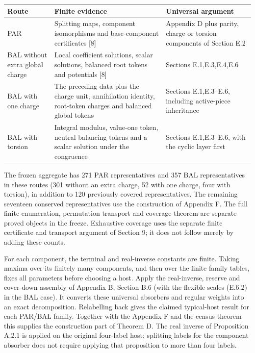 \documentclass[english,11pt,a4paper]{article}
\begin{document}
{\begin{longtable}[]{@{}
  >{\raggedright\arraybackslash}p{}
  >{\raggedright\arraybackslash}p{}
  >{\raggedright\arraybackslash}p{}@{}}
\toprule\noalign{}
\begin{minipage}[b]{\linewidth}\raggedright
Route
\end{minipage} & \begin{minipage}[b]{\linewidth}\raggedright
Finite evidence
\end{minipage} & \begin{minipage}[b]{\linewidth}\raggedright
Universal argument
\end{minipage} \\
\midrule\noalign{}
\endhead
\bottomrule\noalign{}
\endlastfoot
PAR & Splitting maps, component isomorphisms and base-component certificates {[}8{]} & Appendix D plus parity, charge or torsion components of Section E.2 \\
BAL without extra global charge & Local coefficient solutions, scalar solutions, balanced root tokens and potentials {[}8{]} & Sections E.1,E.3,E.4,E.6 \\
BAL with one charge & The preceding data plus the charge unit, annihilation identity, root-token charges and balanced global tokens & Sections E.1,E.3--E.6, including active-piece inheritance \\
BAL with torsion & Integral modulus, value-one token, neutral balancing tokens and a scalar solution under the congruence & Sections E.1,E.3--E.6, with the cyclic layer first \\
\end{longtable}
}

The frozen aggregate has 271 PAR representatives and 357 BAL representatives in these routes (301 without an extra charge, 52 with one charge, four with torsion), in addition to 120 previously covered representatives. The remaining seventeen conserved representatives use the construction of Appendix F. The full finite enumeration, permutation transport and coverage theorem are separate proved objects in the freeze. Exhaustive coverage uses the separate finite certificate and transport argument of Section 9; it does not follow merely by adding these counts.

For each component, the terminal and real-inverse constants are finite. Taking maxima over its finitely many components, and then over the finite family tables, fixes all parameters before choosing a host. Apply the real-inverse, reserve and cover-down assembly of Appendix B, Section B.6 (with the flexible scales (E.6.2) in the BAL case). It converts these universal absorbers and regular weights into an exact decomposition. Relabelling back gives the claimed typical-host result for each PAR/BAL family. Together with the Appendix F and the census theorem this supplies the construction part of Theorem D. The real inverse of Proposition A.2.1 is applied on the original four-label host; splitting labels for the component absorber does not require applying that proposition to more than four labels.
\end{document}
